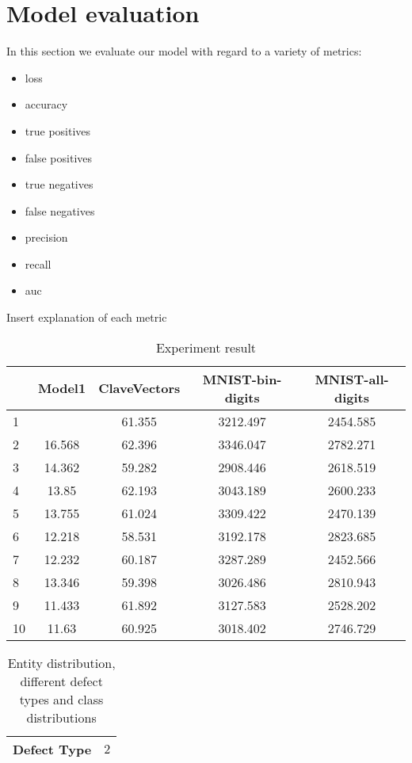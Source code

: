 \section{Model evaluation}
In this section we evaluate our model with regard to a variety of metrics: 
\begin{itemize}
	\item loss
	\item accuracy
	\item true positives
	\item false positives
	\item true negatives
	\item false negatives
	\item precision
	\item recall
	\item auc
\end{itemize}
Insert explanation of each metric
\begin{table}[H]
	\centering
\begin{tabular}{|lcccc|}
	\hline
	\backslashbox{run \#}{Metrics}
&{Model1}&{ClaveVectors}&{MNIST-bin-digits}&{MNIST-all-digits} \\\hline\hline
	1 &  & 61.355 & 3212.497 & 2454.585 \\ \hline
	2 & 16.568 & 62.396 & 3346.047 & 2782.271 \\ \hline
	3 & 14.362 & 59.282 & 2908.446 & 2618.519 \\ \hline
	4 & 13.85 & 62.193 & 3043.189 &  2600.233 \\ \hline
	5 & 13.755 & 61.024 & 3309.422 & 2470.139 \\ \hline
	6 & 12.218 & 58.531 & 3192.178 & 2823.685 \\ \hline
	7 & 12.232 & 60.187 & 3287.289 & 2452.566 \\ \hline
	8 & 13.346 & 59.398 & 3026.486 & 2810.943 \\ \hline
	9 & 11.433 & 61.892 & 3127.583 & 2528.202 \\ \hline
	10 & 11.63 & 60.925 & 3018.402 & 2746.729 \\ \hline
\end{tabular}
	\caption{Experiment result}
\end{table}


\begin{table}[H]
	\centering
	\begin{tabular}{|c|c|} \hline
		\textbf{Defect Type} & $2$ \\ \hline
	\end{tabular}
	\caption{Entity distribution, different defect types and class distributions}
\end{table}



